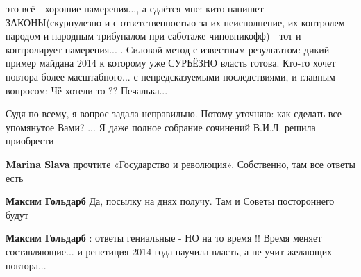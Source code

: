 \begin{itemize}
\begin{itemize}
\end{itemize}


это всё - хорошие намерения..., а сдаётся мне: кито напишет ЗАКОНЫ(скурпулезно
и с ответственностью за их неисполнение, их контролем народом и народным
трибуналом при саботаже чиновникофф) - тот и контролирует намерения... .
Силовой метод с известным результатом: дикий пример майдана 2014 к которому уже
СУРЬЁЗНО власть готова. Кто-то хочет повтора более масштабного... с
непредсказуемыми последствиями, и главным вопросом: Чё хотели-то ?? Печалька...


Судя по всему, я вопрос задала неправильно.
Потому уточняю: как сделать все упомянутое Вами?
...
Я даже полное собрание сочинений В.И.Л. решила приобрести


\begin{itemize}
 
\textbf{Marina Slava} прочтите «Государство и революция». Собственно, там все ответы есть

 
\textbf{Максим Гольдарб} Да, посылку на днях получу.
Там и Советы постороннего будут

 
\textbf{Максим Гольдарб} : ответы гениальные - НО на то время !! Время меняет составляющие... и репетиция 2014 года научила власть, а не учит желающих повтора...

 

\end{itemize}
\end{itemize}
